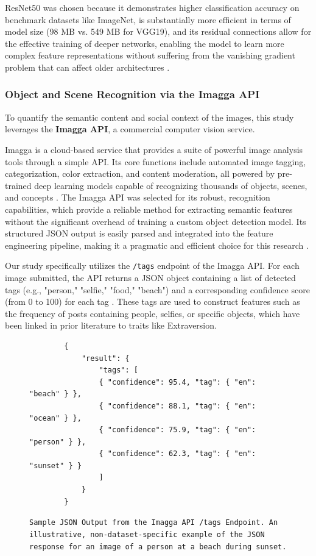 ResNet50 was chosen because it demonstrates higher classification accuracy on benchmark datasets like ImageNet, is substantially more efficient in terms of model size (98 MB vs. 549 MB for VGG19), and its residual connections allow for the effective training of deeper networks, enabling the model to learn more complex feature representations without suffering from the vanishing gradient problem that can affect older architectures \citep{he2015, simonyan2014very}.

\subsubsection{Object and Scene Recognition via the Imagga API}
To quantify the semantic content and social context of the images, this study leverages the \textbf{Imagga API}, a commercial computer vision service.

Imagga is a cloud-based service that provides a suite of powerful image analysis tools through a simple API. Its core functions include automated image tagging, categorization, color extraction, and content moderation, all powered by pre-trained deep learning models capable of recognizing thousands of objects, scenes, and concepts \citep{imagga_website, imagga_solutions}. The Imagga API was selected for its robust, recognition capabilities, which provide a reliable method for extracting semantic features without the significant overhead of training a custom object detection model. Its structured JSON output is easily parsed and integrated into the feature engineering pipeline, making it a pragmatic and efficient choice for this research \citep{imagga_docs}.

Our study specifically utilizes the \texttt{/tags} endpoint of the Imagga API. For each image submitted, the API returns a JSON object containing a list of detected tags (e.g., "person," "selfie," "food," "beach") and a corresponding confidence score (from 0 to 100) for each tag \citep{imagga_docs}. These tags are used to construct features such as the frequency of posts containing people, selfies, or specific objects, which have been linked in prior literature to traits like Extraversion.

\begin{figure}[H]
	\centering
	\begin{verbatim}
		{
			"result": {
				"tags": [
				{ "confidence": 95.4, "tag": { "en": "beach" } },
				{ "confidence": 88.1, "tag": { "en": "ocean" } },
				{ "confidence": 75.9, "tag": { "en": "person" } },
				{ "confidence": 62.3, "tag": { "en": "sunset" } }
				]
			}
		}
	\end{verbatim}
	\caption{ \texttt{Sample JSON Output from the Imagga API /tags Endpoint. An illustrative, non-dataset-specific example of the JSON response for an image of a person at a beach during sunset.}}
	\label{fig:imagga_json}
\end{figure}


